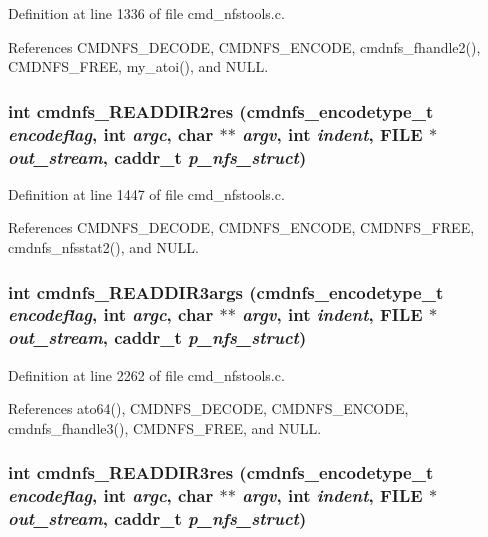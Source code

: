Definition at line 1336 of file cmd\_\-nfstools.c.

References CMDNFS\_\-DECODE, CMDNFS\_\-ENCODE, cmdnfs\_\-fhandle2(), CMDNFS\_\-FREE, my\_\-atoi(), and NULL.
\subsubsection{\setlength{\rightskip}{0pt plus 5cm}int cmdnfs\_\-READDIR2res ({\bf cmdnfs\_\-encodetype\_\-t} {\em encodeflag}, int {\em argc}, char $\ast$$\ast$ {\em argv}, int {\em indent}, FILE $\ast$ {\em out\_\-stream}, caddr\_\-t {\em p\_\-nfs\_\-struct})}\label{cmd__nfstools_8h_a33}




Definition at line 1447 of file cmd\_\-nfstools.c.

References CMDNFS\_\-DECODE, CMDNFS\_\-ENCODE, CMDNFS\_\-FREE, cmdnfs\_\-nfsstat2(), and NULL.
\subsubsection{\setlength{\rightskip}{0pt plus 5cm}int cmdnfs\_\-READDIR3args ({\bf cmdnfs\_\-encodetype\_\-t} {\em encodeflag}, int {\em argc}, char $\ast$$\ast$ {\em argv}, int {\em indent}, FILE $\ast$ {\em out\_\-stream}, caddr\_\-t {\em p\_\-nfs\_\-struct})}\label{cmd__nfstools_8h_a42}




Definition at line 2262 of file cmd\_\-nfstools.c.

References ato64(), CMDNFS\_\-DECODE, CMDNFS\_\-ENCODE, cmdnfs\_\-fhandle3(), CMDNFS\_\-FREE, and NULL.
\subsubsection{\setlength{\rightskip}{0pt plus 5cm}int cmdnfs\_\-READDIR3res ({\bf cmdnfs\_\-encodetype\_\-t} {\em encodeflag}, int {\em argc}, char $\ast$$\ast$ {\em argv}, int {\em indent}, FILE $\ast$ {\em out\_\-stream}, caddr\_\-t {\em p\_\-nfs\_\-struct})}\label{cmd__nfstools_8h_a43}




